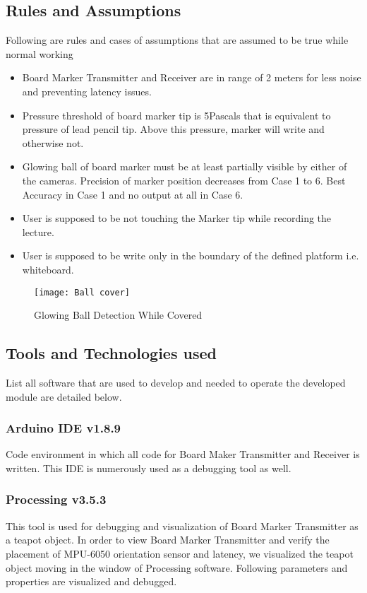 \subsection{Rules and Assumptions}
Following are rules and cases of assumptions that are assumed to be true while normal working
\begin{itemize}

\item Board Marker Transmitter and Receiver are in range of 2 meters for less noise and preventing latency issues.
\item Pressure threshold of board marker tip is 5Pascals that is equivalent to pressure of lead pencil tip. Above this pressure, marker will write and otherwise not.
\item Glowing ball of board marker must be at least partially visible by either of the cameras. Precision of marker position decreases from Case 1 to 6. Best Accuracy in Case 1 and no output at all in Case 6.
\item User is supposed to be not touching the Marker tip while recording the lecture.
\item User is supposed to be write only in the boundary of the defined platform i.e. whiteboard. 

\end{itemize}
\newpage
\begin{figure}[h]
  \centering
  \texttt{[image: Ball cover]}
  \caption{Glowing Ball Detection While Covered}
\end{figure}

\subsection{Tools and Technologies used}
List all software that are used to develop and needed to operate the developed module are detailed below.

\subsubsection{Arduino IDE v1.8.9}
Code environment in which all code for Board Maker Transmitter and Receiver is written. This IDE is numerously used as a debugging tool as well.

\subsubsection{Processing v3.5.3}
This tool is used for debugging and visualization of Board Marker Transmitter as a teapot object. In order to view Board Marker Transmitter and verify the placement of MPU-6050 orientation sensor and latency, we visualized the teapot object moving in the window of Processing software. Following parameters and properties are visualized and debugged.

